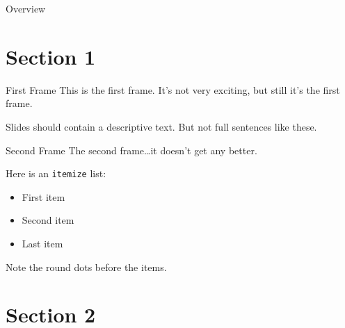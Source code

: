 



\begin{frame}{Overview}
    \tableofcontents
\end{frame}





\section{Section 1}

\begin{frame}{First Frame}
    This is the first frame.
    It's not very exciting, but still it's the first frame.

    Slides should contain a descriptive text.
    But not full sentences like these.
\end{frame}

\begin{frame}{Second Frame}
    The second frame\dots it doesn't get any better.

    Here is an \texttt{itemize} list:
    \begin{itemize}
        \item
        First item

        \item
        Second item

        \item
        Last item
    \end{itemize}
    Note the round dots before the items.
\end{frame}




\section{Section 2}

\usetikzlibrary{decorations.text}

